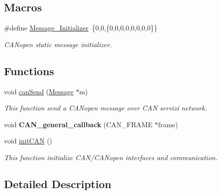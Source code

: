 \subsection*{Macros}
\begin{DoxyCompactItemize}
\item 
\mbox{\label{group___c_a_n__network__module_gaf21e24a8e9f1bf113b5efb16d5ab924b}} 
\#define \mbox{\hyperlink{group___c_a_n__network__module_gaf21e24a8e9f1bf113b5efb16d5ab924b}{Message\+\_\+\+Initializer}}~\{0,0,\{0,0,0,0,0,0,0,0\}\}
\begin{DoxyCompactList}\small\item\em C\+A\+Nopen static message initializer. \end{DoxyCompactList}\end{DoxyCompactItemize}
\subsection*{Functions}
\begin{DoxyCompactItemize}
\item 
void \mbox{\hyperlink{group___c_a_n__network__module_ga44cc9b79c50c2c8eef6b98bac0d24dc9}{can\+Send}} (\mbox{\hyperlink{struct_message}{Message}} $\ast$m)
\begin{DoxyCompactList}\small\item\em This function send a C\+A\+Nopen message over C\+AN servizi network. \end{DoxyCompactList}\item 
\mbox{\label{group___c_a_n__network__module_ga1b1534e44c5652543946053ad1aea5d1}} 
void {\bfseries C\+A\+N\+\_\+general\+\_\+callback} (C\+A\+N\+\_\+\+F\+R\+A\+ME $\ast$frame)
\item 
void \mbox{\hyperlink{group___c_a_n__network__module_gaee4f95b5d4a9e9c330f3a9169464860a}{init\+C\+AN}} ()
\begin{DoxyCompactList}\small\item\em This function initialize C\+A\+N/\+C\+A\+Nopen interfaces and communication. \end{DoxyCompactList}\end{DoxyCompactItemize}


\subsection{Detailed Description}


